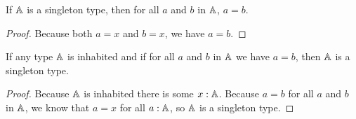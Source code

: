 \documentclass[../math.tex]{subfiles}
\begin{document}
\begin{theorem}
    If $\mathbb{A}$ is a singleton type, then for all $a$ and $b$ in $\mathbb{A}$, $a = b$.
\end{theorem}
\begin{proof}
    Because both $a = x$ and $b = x$, we have $a = b$.
\end{proof}

\begin{theorem}
    If any type $\mathbb{A}$ is inhabited and if for all $a$ and $b$ in $\mathbb{A}$ we have $a
    = b$, then $\mathbb{A}$ is a singleton type.
\end{theorem}
\begin{proof}
    Because $\mathbb{A}$ is inhabited there is some $x : \mathbb{A}$.  Because $a = b$ for all
    $a$ and $b$ in $\mathbb{A}$, we know that $a = x$ for all $a : \mathbb{A}$, so $\mathbb{A}$ is a
    singleton type.
\end{proof}
\end{document}
